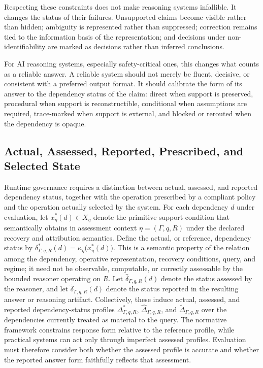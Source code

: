 \documentclass[11pt]{article}
\theoremstyle{definition}
\theoremstyle{remark}
\begin{document}
Respecting these constraints does not make reasoning systems infallible. It changes the status of their failures. Unsupported claims become visible rather than hidden; ambiguity is represented rather than suppressed; correction remains tied to the information basis of the representation; and decisions under non-identifiability are marked as decisions rather than inferred conclusions.

For AI reasoning systems, especially safety-critical ones, this changes what counts as a reliable answer. A reliable system should not merely be fluent, decisive, or consistent with a preferred output format. It should calibrate the form of its answer to the dependency status of the claim: direct when support is preserved, procedural when support is reconstructible, conditional when assumptions are required, trace-marked when support is external, and blocked or rerouted when the dependency is opaque.

\subsection{Actual, Assessed, Reported, Prescribed, and Selected State}
\label{subsec:status-assessment-selection}

Runtime governance requires a distinction between actual, assessed, and reported dependency status, together with the operation prescribed by a compliant policy and the operation actually selected by the system. For each dependency \(d\) under evaluation, let \(x^{*}_{\eta}(d)\in X_{\eta}\) denote the primitive support condition that semantically obtains in assessment context \(\eta=(\Gamma,q,R)\) under the declared recovery and attribution semantics. Define the actual, or reference, dependency status by \(\delta^{*}_{\Gamma,q,R}(d)=\kappa_{\eta}\bigl(x^{*}_{\eta}(d)\bigr)\). This is a semantic property of the relation among the dependency, operative representation, recovery conditions, query, and regime; it need not be observable, computable, or correctly assessable by the bounded reasoner operating on \(R\). Let \(\widehat{\delta}_{\Gamma,q,R}(d)\) denote the status assessed by the reasoner, and let \(\widetilde{\delta}_{\Gamma,q,R}(d)\) denote the status reported in the resulting answer or reasoning artifact. Collectively, these induce actual, assessed, and reported dependency-status profiles \(\Delta^{*}_{\Gamma,q,R}\), \(\widehat{\Delta}_{\Gamma,q,R}\), and \(\widetilde{\Delta}_{\Gamma,q,R}\) over the dependencies currently treated as material to the query. The normative framework constrains response form relative to the reference profile, while practical systems can act only through imperfect assessed profiles. Evaluation must therefore consider both whether the assessed profile is accurate and whether the reported answer form faithfully reflects that assessment.
\end{document}
